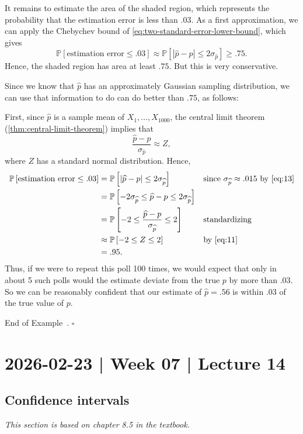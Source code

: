 \documentclass[10pt]{article}
\theoremstyle{definition}
\newtheorem{example}[theorem]{Example}
\renewenvironment{example}
{\begin{oldexample}}
  {\par\smallskip\hfill   End of Example~\theexample. $\square$    \par\end{oldexample}}
\newcommand{\1}[1]{\textbf{1}_{\left[#1\right]}} %
\def\P{\mathbb{P}} %
\begin{document}
\begin{example}[Example 8.2 in textbook]
  It remains to estimate the area of the shaded region, which represents the
  probability that the estimation error is less than $.03$. As a first
  approximation, we can apply the Chebychev bound of
  \cref{eq:two-standard-error-lower-bound}, which gives
  \begin{equation*}
    \P\left[\text{estimation error} \leq .03 \right] \approx \P\left[\left| \widehat{p}-p \right| \leq 2\sigma_{\widehat{p}}\right]  \geq .75.
  \end{equation*}
  Hence, the shaded region has area at least $.75$. But this is very conservative.

  Since we know that $\widehat{p}$ has an approximately Gaussian sampling
  distribution, we can use that information to do can do better than $.75$, as
  follows:

  First, since $\widehat{p}$ is a sample mean of $X_{1},\ldots,X_{1000}$, the
  central limit theorem (\cref{thm:central-limit-theorem}) implies that
  \begin{equation}\label{eq:11}
    \frac{\widehat{p}-p}{\sigma_{\widehat{p}}}\approx Z,
  \end{equation}
  where $Z$ has a standard normal distribution. Hence,
  \begin{align*}
    \P\left[ \text{estimation error} \leq .03\right] 
    &= \P\left[\left| \widehat{p}-p \right| \leq  2\sigma_{\widehat{p}}\right]
    &&\text{since $\sigma_{\widehat{p}}\approx .015$ by \cref{eq:13}}\\
    &= \P\left[-2\sigma_{\widehat{p}} \leq \widehat{p}-p  \leq  2\sigma_{\widehat{p}}\right]\\
    &= \P\left[-2\leq  \frac{\widehat{p}-p}{\sigma_{\widehat{p}}} \leq 2\right] &&\text{standardizing}\\
    &\approx \P\left[ -2 \leq Z \leq 2\right] &&\text{by \cref{eq:11}}\\
    &=.95.
  \end{align*}
  Thus, if we were to repeat this poll 100 times, we would expect that only in
  about 5 such polls would the estimate deviate from the true $p$ by more than
  $.03$. So we can be reasonably confident that our estimate of
  $\widehat{p}=.56$ is within $.03$ of the true value of $p$.
\end{example}

\newpage
\section{2026-02-23 | Week 07 | Lecture 14}
\subsection{Confidence intervals}
\textit{This section is based on chapter 8.5 in the textbook.}
\end{document}
